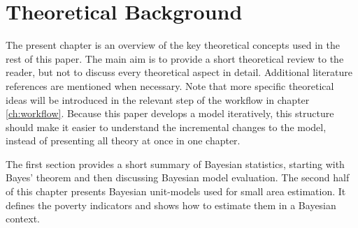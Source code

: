 \chapter{Theoretical Background}
The present chapter is an overview of the key theoretical concepts used in the rest of this paper.
The main aim is to provide a short theoretical review to the reader, but not to discuss every theoretical aspect in detail.
Additional literature references are mentioned when necessary.
Note that more specific theoretical ideas will be introduced in the relevant step of the workflow in chapter \ref{ch:workflow}.
Because this paper develops a model iteratively, this structure should make it easier to understand the incremental changes to the model, instead of presenting all theory at once in one chapter.

The first section provides a short summary of Bayesian statistics, starting with Bayes' theorem and then discussing Bayesian model evaluation.
The second half of this chapter presents Bayesian unit-models used for small area estimation.
It defines the poverty indicators and shows how to estimate them in a Bayesian context.




